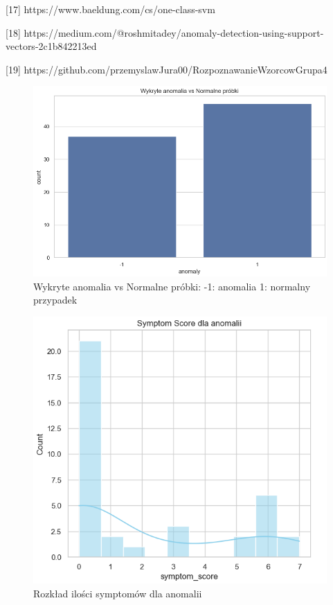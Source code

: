 \documentclass[a4paper,fleqn]{cas-dc}
\begin{document}
[17] https://www.baeldung.com/cs/one-class-svm

[18] https://medium.com/@roshmitadey/anomaly-detection-using-support-vectors-2c1b842213ed

[19] https://github.com/przemyslawJura00/RozpoznawanieWzorcowGrupa4




\newpage
\newpage
\begin{figure}[h]
	\includegraphics[scale=.40]{wykresy/wykres1.png}
	\caption{Wykryte anomalia vs Normalne próbki: -1: anomalia 1: normalny przypadek}
	\label{FIG:1}
\end{figure}

\begin{figure}[h]
	\includegraphics[scale=.73]{wykresy/wykres2.1.png}
	\caption{Rozkład ilości symptomów dla anomalii}
	\label{FIG:1}
\end{figure}
\end{document}
